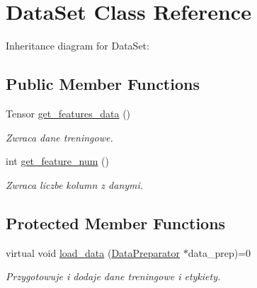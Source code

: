 \hypertarget{classDataSet}{}\section{Data\+Set Class Reference}
\label{classDataSet}


Inheritance diagram for Data\+Set\+:
\subsection*{Public Member Functions}
\begin{DoxyCompactItemize}
\item 
\mbox{\label{classDataSet_a3b8181e6a14733ab9461cd095c062b8d}} 
Tensor \hyperlink{classDataSet_a3b8181e6a14733ab9461cd095c062b8d}{get\+\_\+features\+\_\+data} ()
\begin{DoxyCompactList}\small\item\em Zwraca dane treningowe. \end{DoxyCompactList}\item 
\mbox{\label{classDataSet_ae5287fb75b5cd912354606e8eb1dfb90}} 
int \hyperlink{classDataSet_ae5287fb75b5cd912354606e8eb1dfb90}{get\+\_\+feature\+\_\+num} ()
\begin{DoxyCompactList}\small\item\em Zwraca liczbe kolumn z danymi. \end{DoxyCompactList}\end{DoxyCompactItemize}
\subsection*{Protected Member Functions}
\begin{DoxyCompactItemize}
\item 
\mbox{\label{classDataSet_ac8f6a1c661e9345ab24f6074fa77d8d3}} 
virtual void \hyperlink{classDataSet_ac8f6a1c661e9345ab24f6074fa77d8d3}{load\+\_\+data} (\hyperlink{classDataPreparator}{Data\+Preparator} $\ast$data\+\_\+prep)=0
\begin{DoxyCompactList}\small\item\em Przygotowuje i dodaje dane treningowe i etykiety. \end{DoxyCompactList}\end{DoxyCompactItemize}
